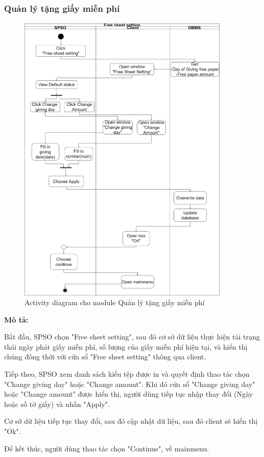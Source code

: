 \subsubsection{Quản lý tặng giấy miễn phí}
\begin{figure}[H]
    \begin{center}
        \includegraphics[width=0.9\textwidth]{Images/System Modelling/FreeSheetSetting_Activity.png}
        \caption{Activity diagram cho module Quản lý tặng giấy miễn phí}
        \label{fig:arch}
    \end{center}
\end{figure}

\textbf{Mô tả:}\par
Bắt đầu, SPSO chọn "Free sheet setting", sau đó cơ sở dữ liệu thực hiện tải trạng thái ngày phát giấy miễn phí, số lượng của giấy miễn phí hiện tại, và hiển thị chúng đồng thời với cửa sổ "Free sheet setting" thông qua client. \par
Tiếp theo, SPSO xem danh sách kiểu tệp được in và quyết định thao tác chọn "Change giving day" hoặc "Change amount". Khi đó cửa sổ "Change giving day" hoặc "Change amount" được hiển thị, người dùng tiếp tục nhập thay đổi (Ngày hoặc số tờ giấy) và nhấn "Apply".\par
Cơ sở dữ liệu tiếp tục thay đổi, sau đó cập nhật dữ liệu, sau đó client sẽ hiển thị "Ok".\par
Để kết thúc, người dùng thao tác chọn "Continue", về mainmenu.




